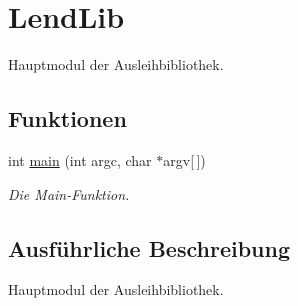 \hypertarget{group___lend_lib}{}\section{Lend\+Lib}
\label{group___lend_lib}


Hauptmodul der Ausleihbibliothek.  


\subsection*{Funktionen}
\begin{DoxyCompactItemize}
\item 
int \hyperlink{group___lend_lib_ga0ddf1224851353fc92bfbff6f499fa97}{main} (int argc, char $\ast$argv\mbox{[}$\,$\mbox{]})\hypertarget{group___lend_lib_ga0ddf1224851353fc92bfbff6f499fa97}{}\label{group___lend_lib_ga0ddf1224851353fc92bfbff6f499fa97}

\begin{DoxyCompactList}\small\item\em Die Main-\/\+Funktion. \end{DoxyCompactList}\end{DoxyCompactItemize}


\subsection{Ausführliche Beschreibung}
Hauptmodul der Ausleihbibliothek. 

